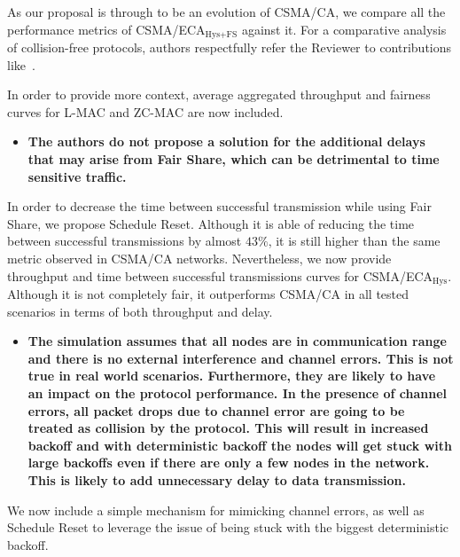 \documentclass[]{article}
\begin{document}
	As our proposal is through to be an evolution of CSMA/CA, we compare all the performance metrics of CSMA/ECA$_{\text{Hys+FS}}$ against it. For a comparative analysis of collision-free protocols, authors respectfully refer the Reviewer to contributions like~\cite{L_MAC}.
	
	 In order to provide more context, average aggregated throughput and fairness curves for L-MAC and ZC-MAC are now included.
	
	\begin{itemize}
		\item {\bfseries The authors do not propose a solution for the additional delays that may arise from Fair Share, which can be detrimental to time sensitive traffic.}
	\end{itemize}
	
	In order to decrease the time between successful transmission while using Fair Share, we propose Schedule Reset. Although it is able of reducing the time between successful transmissions by almost $43\%$, it is still higher than the same metric observed in CSMA/CA networks. Nevertheless, we now provide throughput and time between successful transmissions curves for CSMA/ECA$_{\text{Hys}}$. Although it is not completely fair, it outperforms CSMA/CA in all tested scenarios in terms of both throughput and delay.

%	
	\begin{itemize}
		\item {\bfseries The simulation assumes that all nodes are in communication range and there is no external interference and channel errors. This is not true in real world scenarios. Furthermore, they are likely to have an impact on the protocol performance. In the presence of channel errors, all packet drops due to channel error are going to be treated as collision by the protocol. This will result in increased backoff and with deterministic backoff the nodes will get stuck with large backoffs even if there are only a few nodes in the network. This is likely to add unnecessary delay to data transmission.}
	\end{itemize}
	
		We now include a simple mechanism for mimicking channel errors, as well as Schedule Reset to leverage the issue of being stuck with the biggest deterministic backoff.
		
\end{document}
